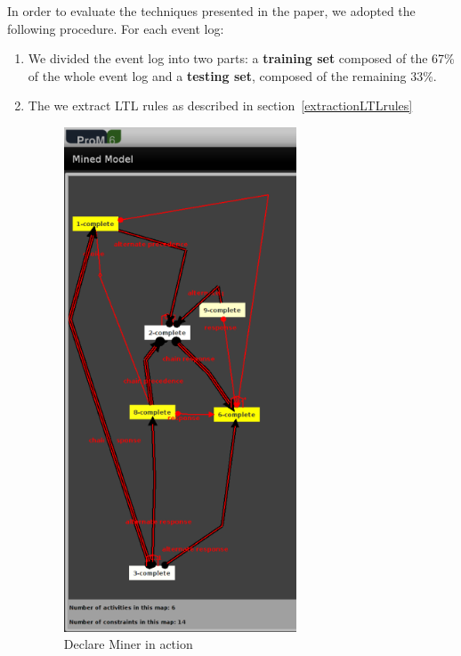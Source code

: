 In order to evaluate the techniques presented in the paper, we adopted the following procedure. For each event log:
\begin{enumerate}
\item We divided the event log into two parts: a \textbf{training set} composed of the 67\% of the whole event log and a \textbf{testing set}, composed of the remaining 33\%.
\item The we extract LTL rules as described in section~\ref{extractionLTLrules}

\begin{figure}[!ht]
	\begin{center}  
		\includegraphics[height=15cm]{3_ltl_prom.png}
		\caption{Declare Miner in action}
		\label{figure:ltl}
	\end{center}
\end{figure}



\end{enumerate}
